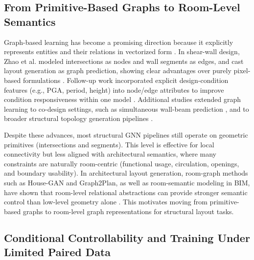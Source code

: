 \subsection{From Primitive-Based Graphs to Room-Level Semantics}
\label{subsec:graph_repr_gnn}

Graph-based learning has become a promising direction because it explicitly represents entities and their relations in vectorized form \cite{Bronstein_2017,Wu_2021,Hamilton_2020}. In shear-wall design, Zhao et al. modeled intersections as nodes and wall segments as edges, and cast layout generation as graph prediction, showing clear advantages over purely pixel-based formulations \cite{zhaoIntelligentDesignShear2023b}. Follow-up work incorporated explicit design-condition features (e.g., PGA, period, height) into node/edge attributes to improve condition responsiveness within one model \cite{zhaoDesignconditioninformedShearWall2023d}. Additional studies extended graph learning to co-design settings, such as simultaneous wall-beam prediction \cite{IntelligentCodesignShear2025}, and to broader structural topology generation pipelines \cite{zhangEndtoendGenerationStructural,longTwostageAutomatedGeneration2026}.

Despite these advances, most structural GNN pipelines still operate on geometric primitives (intersections and segments). This level is effective for local connectivity but less aligned with architectural semantics, where many constraints are naturally room-centric (functional usage, circulation, openings, and boundary usability). In architectural layout generation, room-graph methods such as House-GAN and Graph2Plan, as well as room-semantic modeling in BIM, have shown that room-level relational abstractions can provide stronger semantic control than low-level geometry alone \cite{nauataHouseGANRelationalGenerative2020,huGraph2PlanLearningFloorplan2020,Wang_2022,nauataHouseGANGenerativeAdversarial2021a}. This motivates moving from primitive-based graphs to room-level graph representations for structural layout tasks.



\subsection{Conditional Controllability and Training Under Limited Paired Data}
\label{subsec:conditional_data_scarcity}

